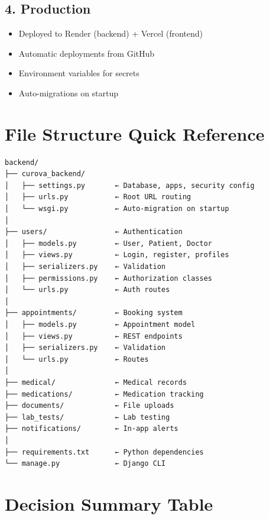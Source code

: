 \documentclass[11pt,a4paper,twoside]{report}
\begin{document}
\subsection*{4. Production}
\begin{itemize}
    \item Deployed to Render (backend) + Vercel (frontend)
    \item Automatic deployments from GitHub
    \item Environment variables for secrets
    \item Auto-migrations on startup
\end{itemize}

\section*{File Structure Quick Reference}

\begin{verbatim}
backend/
├── curova_backend/
│   ├── settings.py       ← Database, apps, security config
│   ├── urls.py           ← Root URL routing  
│   └── wsgi.py           ← Auto-migration on startup
│
├── users/                ← Authentication
│   ├── models.py         ← User, Patient, Doctor
│   ├── views.py          ← Login, register, profiles
│   ├── serializers.py    ← Validation
│   ├── permissions.py    ← Authorization classes
│   └── urls.py           ← Auth routes
│
├── appointments/         ← Booking system
│   ├── models.py         ← Appointment model
│   ├── views.py          ← REST endpoints
│   ├── serializers.py    ← Validation
│   └── urls.py           ← Routes
│
├── medical/              ← Medical records
├── medications/          ← Medication tracking
├── documents/            ← File uploads
├── lab_tests/            ← Lab testing
├── notifications/        ← In-app alerts
│
├── requirements.txt      ← Python dependencies
└── manage.py             ← Django CLI
\end{verbatim}

\section*{Decision Summary Table}
\end{document}
